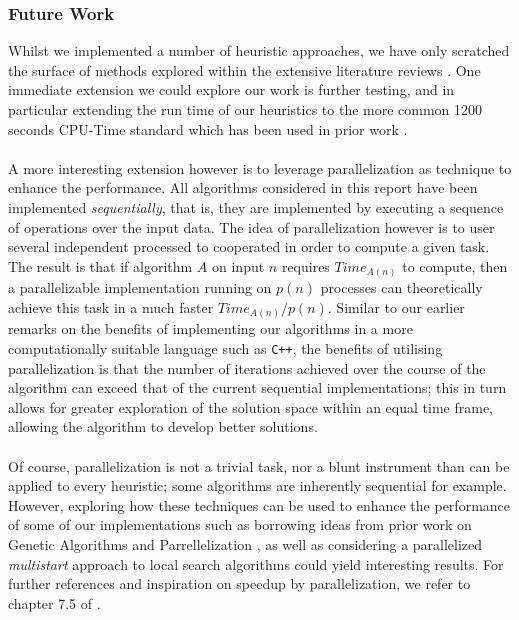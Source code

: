 \documentclass[a4paper,10pt]{article}
\begin{document}
\subsubsection*{Future Work}
Whilst we implemented a number of heuristic approaches, we have only scratched the surface of methods explored within the extensive literature reviews \cite{article}. One immediate extension we could explore our work is further testing, and in particular extending the run time of our heuristics to the more common 1200 seconds CPU-Time standard which has been used in prior work \cite{stuzle, 1994Improved, TATE199573}. \\
\\
A more interesting extension however is to leverage parallelization as technique to enhance the performance. All algorithms considered in this report have been implemented \textit{sequentially}, that is, they are implemented by executing a sequence of operations over the input data. The idea of parallelization however is to user several independent processed to cooperated in order to compute a given task. The result is that if algorithm $A$ on input $n$ requires $Time_{A(n)}$ to compute, then a parallelizable implementation running on $p(n)$ processes can theoretically achieve this task in a much faster $Time_{A(n)}/p(n)$. Similar to our earlier remarks on the benefits of implementing our algorithms in a more computationally suitable language such as \texttt{C++}, the benefits of utilising parallelization is that the number of iterations achieved over the course of the algorithm can exceed that of the current sequential implementations; this in turn allows for greater exploration of the solution space within an equal time frame, allowing the algorithm to develop better solutions. \\
\\
Of course, parallelization is not a trivial task, nor a blunt instrument than can be applied to every heuristic; some algorithms are inherently sequential for example. However, exploring how these techniques can be used to enhance the performance of some of our implementations such as borrowing ideas from prior work on Genetic Algorithms and Parrellelization \cite{CANTUPAZ2000221}, as well as considering a parallelized \textit{multistart} approach to local search algorithms \cite{Gy_rgy_2011} could yield interesting results. For further references and inspiration on speedup by parallelization, we refer to chapter 7.5 of \cite{AlgorithmicsTextbook}. \\
\\
\end{document}
